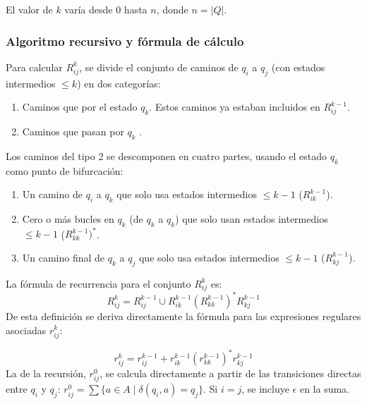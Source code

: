 El valor de $k$ varía desde $0$ hasta $n$, donde $n = |Q|$.

\subsubsection{Algoritmo recursivo y fórmula de cálculo} %

Para calcular $R_{ij}^k$, se divide el conjunto de caminos de $q_i$ a $q_j$ (con estados intermedios $\le k$) en dos categorías:

\begin{enumerate}
    \item Caminos que  por el estado $q_k$. Estos caminos ya estaban incluidos en $R_{ij}^{k-1}$.
    \item Caminos que pasan por $q_k$ .
\end{enumerate}

Los caminos del tipo 2 se descomponen en cuatro partes, usando el estado $q_k$ como punto de bifurcación:
\begin{enumerate}
    \item Un camino de $q_i$ a $q_k$ que solo usa estados intermedios $\le k-1$ ($R_{ik}^{k-1}$).
    \item Cero o más bucles en $q_k$ (de $q_k$ a $q_k$) que solo usan estados intermedios $\le k-1$ ($R_{kk}^{k-1})^*$.
    \item Un camino final de $q_k$ a $q_j$ que solo usa estados intermedios $\le k-1$ ($R_{kj}^{k-1}$).
\end{enumerate}

La fórmula de recurrencia para el conjunto $R_{ij}^k$ es:
\[ R_{ij}^k = R_{ij}^{k-1} \cup R_{ik}^{k-1} (R_{kk}^{k-1})^* R_{kj}^{k-1} \]
De esta definición se deriva directamente la fórmula para las expresiones regulares asociadas $r_{ij}^k$:

\begin{equation}
r_{ij}^k = r_{ij}^{k-1} + r_{ik}^{k-1}(r_{kk}^{k-1})^*r_{kj}^{k-1}
\end{equation}
La  de la recursión, $r_{ij}^0$, se calcula directamente a partir de las transiciones directas entre $q_i$ y $q_j$: $r_{ij}^0 = \sum \{a \in A \mid \delta(q_i, a) = q_j\}$. Si $i=j$, se incluye $\epsilon$ en la suma.

